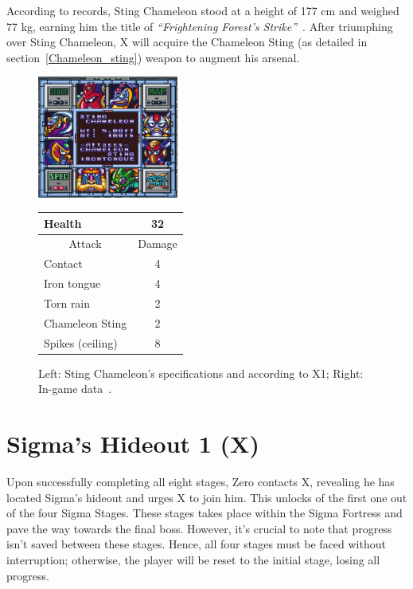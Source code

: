 According to records, Sting Chameleon stood at a height of 177 cm and weighed 77 kg, earning him the title of \textit{``Frightening Forest's Strike''}~\cite{book:MMX_Complete_art}. After triumphing over Sting Chameleon, X will acquire the Chameleon Sting (as detailed in section~\ref{Chameleon_sting}) weapon to augment his arsenal.


\begin{figure}[htp]
	\begin{minipage}[c]{0.45\linewidth}
		\vspace{0pt}
		\centering
		\includegraphics[height=4cm]{figures/X1/Sting_chameleon/Sting_chameleon_specs.png}
	\end{minipage}
	\begin{minipage}[c]{0.45\linewidth}
		\centering
		\vspace{0pt}
		\begin{tabular}[h]{l c}
			\toprule
			Health  & 32\\
			\midrule
			\multicolumn{1}{c}{Attack} & \multicolumn{1}{c}{Damage}\\
			Contact & 4\\
			Iron tongue & 4\\
			Torn rain & 2\\
			Chameleon Sting & 2\\
			Spikes (ceiling) & 8\\
			\bottomrule
		\end{tabular}
	\end{minipage}
	\caption{Left: Sting Chameleon's specifications and according to X1; Right: In-game data~\cite{wiki:Sting_chameleon,book:Compendium}. }
	\label{Chameleon_specs}
\end{figure}

\section{Sigma's Hideout 1 (X)}
Upon successfully completing all eight stages, Zero contacts X, revealing he has located Sigma's hideout and urges X to join him. This unlocks of the first one out of the four Sigma Stages. These stages takes place within the Sigma Fortress and pave the way towards the final boss. However, it's crucial to note that progress isn't saved between these stages. Hence, all four stages must be faced without interruption; otherwise, the player will be reset to the initial stage, losing all progress.

